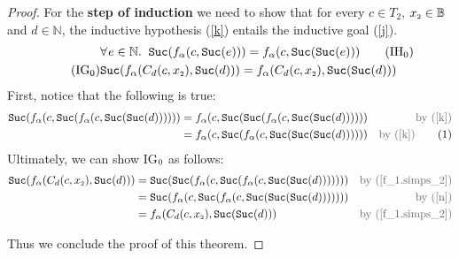 \documentclass{article}
\newcommand\numberthis{\addtocounter{equation}{1}\tag{\theequation}}
\theoremstyle{definition}
\begin{document}
\begin{proof}
        \noindent For the \textbf{step of induction} we need to show that for every $c \in T_{2}$, $x_{\mbox{\tiny 2}} \in \mathbb{B}$ and $d \in \mathbb{N}$, the inductive hypothesis (\ref{k}) entails the inductive goal (\ref{j}).
        \begin{align}
        \label{k} 
        &\forall\hspace{1pt} e \in \mathbb{N}. \; \; {\tt{Suc}}(f_{\alpha}(c, {\tt{Suc}}(e))) = f_{\alpha}(c, {\tt{Suc}}({\tt{Suc}}(e)))
        \tag{IH$_{\thesection}$}
        \\
        \label{j} \tag{IG$_{\thesection}$}
        &{\tt{Suc}}(f_{\alpha}(C_{d}(c, x_{\mbox{\tiny 2}}), {\tt{Suc}}(d))) = f_{\alpha}(C_{d}(c, x_{\mbox{\tiny 2}}), {\tt{Suc}}({\tt{Suc}}(d)))
        \end{align}
        First, notice that the following is true: 
        \begin{align*}
        {\tt{Suc}}(f_{\alpha}(c, {\tt{Suc}}(f_{\alpha}(c, {\tt{Suc}}({\tt{Suc}}(d))))))
        &= f_{\alpha}(c, {\tt{Suc}}({\tt{Suc}}(f_{\alpha}(c, {\tt{Suc}}({\tt{Suc}}(d)))))) &\mbox{\color{gray}{by (\ref{k})}}\\
        &= f_{\alpha}(c, {\tt{Suc}}(f_{\alpha}(c, {\tt{Suc}}({\tt{Suc}}({\tt{Suc}}(d)))))) &\mbox{\color{gray}{by (\ref{k})}}
        \numberthis \label{n}
        \end{align*}
        Ultimately, we can show IG$_{\thesection}$ as follows:
        \begin{align*}
        {\tt{Suc}}(f_{\alpha}(C_{d}(c, x_{\mbox{\tiny 2}}), {\tt{Suc}}(d)))
        &= {\tt{Suc}}({\tt{Suc}}(f_{\alpha}(c, {\tt{Suc}}(f_{\alpha}(c, {\tt{Suc}}({\tt{Suc}}(d))))))) &\mbox{\color{gray}{by (\ref{f_1.simps_2})}}\\
        &= {\tt{Suc}}(f_{\alpha}(c, {\tt{Suc}}(f_{\alpha}(c, {\tt{Suc}}({\tt{Suc}}({\tt{Suc}}(d))))))) &\mbox{\color{gray}{by (\ref{n})}}\\
        &= f_{\alpha}(C_{d}(c, x_{\mbox{\tiny 2}}), {\tt{Suc}}({\tt{Suc}}(d))) &\mbox{\color{gray}{by (\ref{f_1.simps_2})}}
        \end{align*}
        
Thus we conclude the proof of this theorem.
\end{proof}
\end{document}
